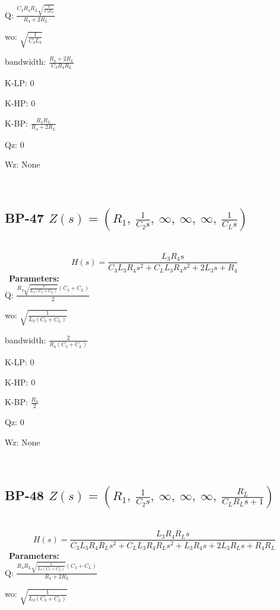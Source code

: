 \documentclass{article}
\begin{document}
Q: $\frac{C_{3} R_{4} R_{L} \sqrt{\frac{1}{C_{3} L_{3}}}}{R_{4} + 2 R_{L}}$\ 

wo: $\sqrt{\frac{1}{C_{3} L_{3}}}$\ 

bandwidth: $\frac{R_{4} + 2 R_{L}}{C_{3} R_{4} R_{L}}$\ 

K-LP: $0$\ 

K-HP: $0$\ 

K-BP: $\frac{R_{4} R_{L}}{R_{4} + 2 R_{L}}$\ 

Qz: $0$\ 

Wz: $\text{None}$\ 

\ 

\subsection{BP-47 $Z(s) = \left( R_{1}, \  \frac{1}{C_{2} s}, \  \infty, \  \infty, \  \infty, \  \frac{1}{C_{L} s}\right)$ } \ 
\textbf{\[H(s) = \frac{L_{3} R_{4} s}{C_{3} L_{3} R_{4} s^{2} + C_{L} L_{3} R_{4} s^{2} + 2 L_{3} s + R_{4}}\] } \ 
\textbf{Parameters:}\\ 

Q: $\frac{R_{4} \sqrt{\frac{1}{L_{3} \left(C_{3} + C_{L}\right)}} \left(C_{3} + C_{L}\right)}{2}$\ 

wo: $\sqrt{\frac{1}{L_{3} \left(C_{3} + C_{L}\right)}}$\ 

bandwidth: $\frac{2}{R_{4} \left(C_{3} + C_{L}\right)}$\ 

K-LP: $0$\ 

K-HP: $0$\ 

K-BP: $\frac{R_{4}}{2}$\ 

Qz: $0$\ 

Wz: $\text{None}$\ 

\ 

\subsection{BP-48 $Z(s) = \left( R_{1}, \  \frac{1}{C_{2} s}, \  \infty, \  \infty, \  \infty, \  \frac{R_{L}}{C_{L} R_{L} s + 1}\right)$ } \ 
\textbf{\[H(s) = \frac{L_{3} R_{4} R_{L} s}{C_{3} L_{3} R_{4} R_{L} s^{2} + C_{L} L_{3} R_{4} R_{L} s^{2} + L_{3} R_{4} s + 2 L_{3} R_{L} s + R_{4} R_{L}}\] } \ 
\textbf{Parameters:}\\ 

Q: $\frac{R_{4} R_{L} \sqrt{\frac{1}{L_{3} \left(C_{3} + C_{L}\right)}} \left(C_{3} + C_{L}\right)}{R_{4} + 2 R_{L}}$\ 

wo: $\sqrt{\frac{1}{L_{3} \left(C_{3} + C_{L}\right)}}$\ 
\end{document}
